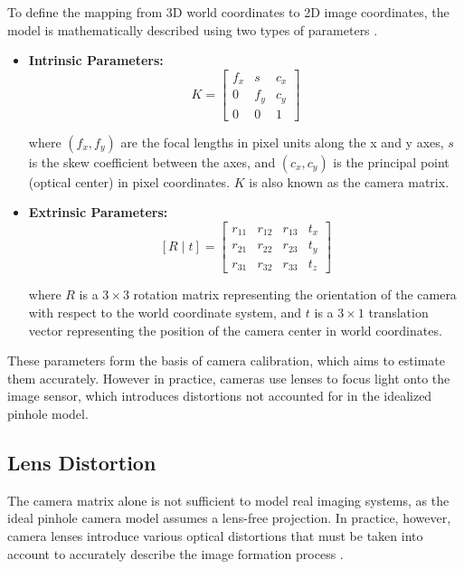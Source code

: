 \documentclass[12pt]{scrartcl}
\begin{document}
To define the mapping from 3D world coordinates to 2D image coordinates,
the model is mathematically described using two types of parameters \cite{MathWorksCameraCalibration}.

\vspace{0.2cm}
\begin{itemize}
  \item \textbf{Intrinsic Parameters: \hspace{6mm}} 
  \[
  K = 
  \begin{bmatrix}
  f_x & s & c_x \\
  0 & f_y & c_y \\
  0 & 0 & 1
  \end{bmatrix}
  \] 
  
  \vspace{0.1cm}
  where $(f_x, f_y)$ are the focal lengths in pixel units along the x and y axes,
  $s$ is the skew coefficient between the axes, and $(c_x, c_y)$ is the principal point (optical center) in pixel coordinates.
  $K$ is also known as the camera matrix.

  \item \textbf{Extrinsic Parameters:} 
  \[
  [R \mid t] = 
  \begin{bmatrix}
  r_{11} & r_{12} & r_{13} & t_x \\
  r_{21} & r_{22} & r_{23} & t_y \\
  r_{31} & r_{32} & r_{33} & t_z
  \end{bmatrix}
  \]

  where $R$ is a $3 \times 3$ rotation matrix representing the orientation of the camera with respect to the world coordinate system, and $t$ is a $3 \times 1$ translation vector representing the position of the camera center in world coordinates.
\end{itemize}

These parameters form the basis of camera calibration, which aims to estimate them accurately. However in practice, cameras use lenses to focus light onto the image sensor, which introduces distortions not accounted for in the idealized pinhole model.

\subsection{Lens Distortion}

The camera matrix alone is not sufficient to model real imaging systems, as the
ideal pinhole camera model assumes a lens-free projection. In practice, however, camera lenses introduce various optical distortions that must be taken into account to accurately describe the image formation process \cite{MathWorksCameraCalibration}.
\newline
\end{document}
